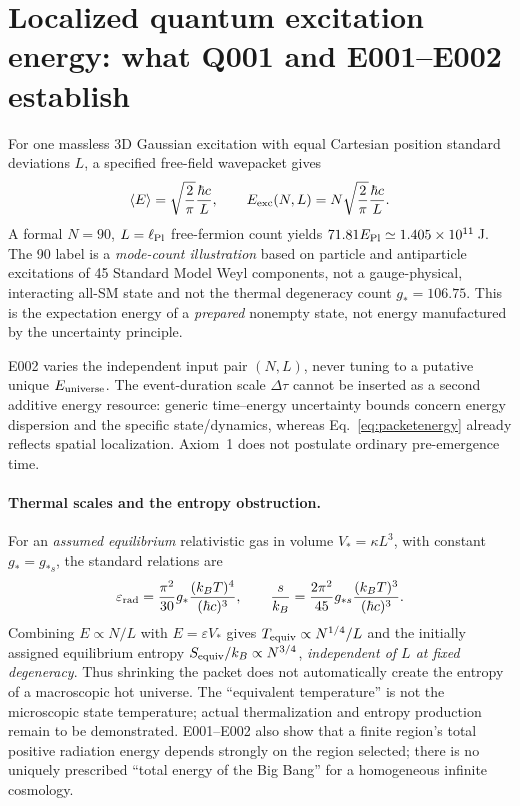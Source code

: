 \documentclass[11pt,a4paper]{article}
\theoremstyle{tmon}
\theoremstyle{definition}
\begin{document}
\section{Localized quantum excitation energy: what Q001 and E001--E002 establish}\label{sec:localized}
For one massless 3D Gaussian excitation with equal Cartesian position standard deviations $L$, a specified free-field wavepacket gives
\begin{equation}\label{eq:packetenergy}
\langle E\rangle=\sqrt{\frac{2}{\pi}}\frac{\hbar c}{L},\qquad
E_{\rm exc}(N,L)=N\sqrt{\frac{2}{\pi}}\frac{\hbar c}{L}.
\end{equation}
A formal $N=90$, $L=\ell_{\rm Pl}$ free-fermion count yields $71.81E_{\rm Pl}\simeq1.405\times10^{11}$\,J. The 90 label is a \emph{mode-count illustration} based on particle and antiparticle excitations of 45 Standard Model Weyl components, not a gauge-physical, interacting all-SM state and not the thermal degeneracy count $g_*=106.75$. This is the expectation energy of a \emph{prepared} nonempty state, not energy manufactured by the uncertainty principle.

E002 varies the independent input pair $(N,L)$, never tuning to a putative unique $E_{\rm universe}$. The event-duration scale $\Delta\tau$ cannot be inserted as a second additive energy resource: generic time--energy uncertainty bounds concern energy dispersion and the specific state/dynamics, whereas Eq.~\eqref{eq:packetenergy} already reflects spatial localization. Axiom~1 does not postulate ordinary pre-emergence time.

\paragraph{Thermal scales and the entropy obstruction.}
For an \emph{assumed equilibrium} relativistic gas in volume $V_*=\kappa L^3$, with constant $g_*=g_{*s}$, the standard relations are
\begin{equation}\label{eq:thermo}
\varepsilon_{\rm rad}=\frac{\pi^2}{30}g_*\frac{(k_BT)^4}{(\hbar c)^3},\qquad
\frac{s}{k_B}=\frac{2\pi^2}{45}g_{*s}\frac{(k_BT)^3}{(\hbar c)^3}.
\end{equation}
Combining $E\propto N/L$ with $E=\varepsilon V_*$ gives $T_{\rm equiv}\propto N^{1/4}/L$ and the initially assigned equilibrium entropy $S_{\rm equiv}/k_B\propto N^{3/4}$, \emph{independent of $L$ at fixed degeneracy}. Thus shrinking the packet does not automatically create the entropy of a macroscopic hot universe. The ``equivalent temperature'' is not the microscopic state temperature; actual thermalization and entropy production remain to be demonstrated. E001--E002 also show that a finite region's total positive radiation energy depends strongly on the region selected; there is no uniquely prescribed ``total energy of the Big Bang'' for a homogeneous infinite cosmology.
\end{document}
